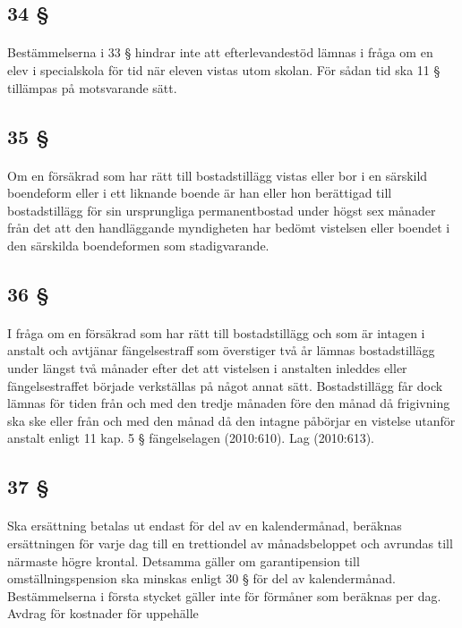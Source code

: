 \documentclass[a4paper,notitlepage,openany,10pt]{book}
\begin{document}
\subsection*{34 §}
\paragraph*{}
Bestämmelserna i 33 § hindrar inte att efterlevandestöd lämnas i fråga om en elev i specialskola för tid när eleven vistas utom skolan. För sådan tid ska 11 § tillämpas på motsvarande sätt.
\subsection*{35 §}
\paragraph*{}
Om en försäkrad som har rätt till bostadstillägg vistas eller bor i en särskild boendeform eller i ett liknande boende är han eller hon berättigad till bostadstillägg för sin ursprungliga permanentbostad under högst sex månader från det att den handläggande myndigheten har bedömt vistelsen eller boendet i den särskilda boendeformen som stadigvarande.
\subsection*{36 §}
\paragraph*{}
I fråga om en försäkrad som har rätt till bostadstillägg och som är intagen i anstalt och avtjänar fängelsestraff som överstiger två år lämnas bostadstillägg under längst två månader efter det att vistelsen i anstalten inleddes eller fängelsestraffet började verkställas på något annat sätt.
Bostadstillägg får dock lämnas för tiden från och med den tredje månaden före den månad då frigivning ska ske eller från och med den månad då den intagne påbörjar en vistelse utanför anstalt enligt 11 kap. 5 § fängelselagen (2010:610).
Lag (2010:613).
\subsection*{37 §}
\paragraph*{}
Ska ersättning betalas ut endast för del av en kalendermånad, beräknas ersättningen för varje dag till en trettiondel av månadsbeloppet och avrundas till närmaste högre krontal. Detsamma gäller om garantipension till omställningspension ska minskas enligt 30 § för del av kalendermånad.
Bestämmelserna i första stycket gäller inte för förmåner som beräknas per dag.
Avdrag för kostnader för uppehälle
\end{document}
